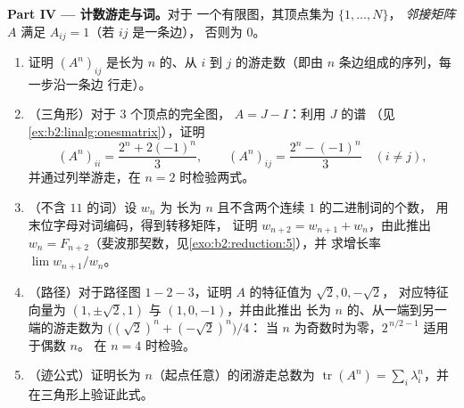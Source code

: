 \begin{problem}
\medskip
\noindent\textbf{Part IV --- 计数游走与词。}对于
一个有限图，其顶点集为 $\{1, \dots, N\}$，
\emph{邻接矩阵} $A$ 满足 $A_{ij} = 1$（若 $ij$ 是一条边），
否则为 $0$。
\begin{enumerate}[resume]
  \item 证明 $(A^n)_{ij}$ 是长为
        $n$ 的、从 $i$ 到 $j$ 的游走数（即由 $n$ 条边组成的序列，每一步沿一条边
        行走）。
  \item （三角形）对于 $3$ 个顶点的完全图，
        $A = J - I$：利用 $J$ 的谱
        （见\cref{ex:b2:linalg:onesmatrix}），证明
        \[
        (A^n)_{ii} = \frac{2^n + 2(-1)^n}{3},
        \qquad
        (A^n)_{ij} = \frac{2^n - (-1)^n}{3} \quad (i \neq j),
        \]
        并通过列举游走，在 $n = 2$ 时检验两式。
  \item （不含 $11$ 的词）设 $w_n$ 为
        长为 $n$ 且不含两个连续 $1$ 的二进制词的个数，
        用末位字母对词编码，得到转移矩阵，
        证明 $w_{n+2} = w_{n+1} + w_n$，由此推出 $w_n =
        F_{n+2}$（斐波那契数，见\cref{exo:b2:reduction:5}），并
        求增长率 $\lim w_{n+1}/w_n$。
  \item （路径）对于路径图 $1 - 2 - 3$，证明
        $A$ 的特征值为 $\sqrt2, 0, -\sqrt2$，
        对应特征向量为 $(1, \pm\sqrt2, 1)$ 与 $(1, 0, -1)$，并由此推出
        长为 $n$ 的、从一端到另一端的游走数为
        $\bigl((\sqrt2)^n + (-\sqrt2)^n\bigr)/4$：
        当 $n$ 为奇数时为零，$2^{\,n/2 - 1}$ 适用于偶数 $n$。
        在 $n = 4$ 时检验。
  \item （迹公式）证明长为
        $n$（起点任意）的闭游走总数为
        $\operatorname{tr}(A^n) = \sum_i \lambda_i^n$，并
        在三角形上验证此式。
\end{enumerate}


\end{problem}
